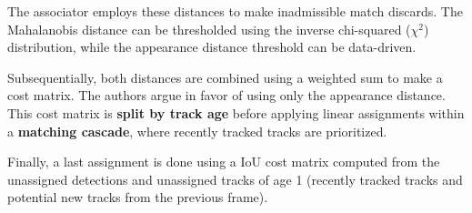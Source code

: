 {
    The associator employs these distances to make inadmissible match discards. 
    The Mahalanobis distance can be thresholded using the inverse chi-squared ($\chi^2$) distribution, 
    while the appearance distance threshold can be data-driven.
}

{
    Subsequentially, both distances are combined using a weighted sum to make a cost matrix. 
    The authors argue in favor of using only the appearance distance. 
    This cost matrix is \textbf{split by track age} before applying linear assignments within a \textbf{matching cascade}, where recently tracked tracks are prioritized.
}

{
    Finally, a last assignment is done using a \ac{IoU} cost matrix computed from the unassigned detections and unassigned tracks of age 1 (recently tracked tracks and potential new tracks from the previous frame).
}

